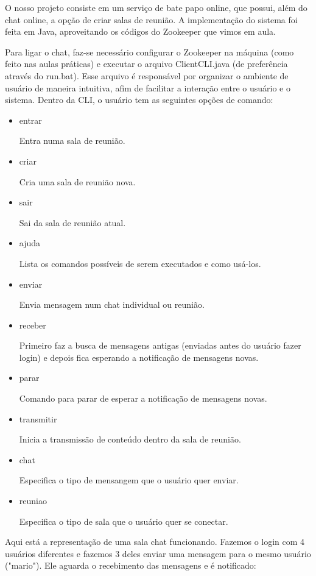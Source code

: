 \setlength{\parindent}{4em}
\setlength{\parskip}{1em}

O nosso projeto consiste em um serviço de bate papo online, que possui, além do chat online, a opção de criar salas de reunião. A implementação do sistema foi feita em Java, aproveitando os códigos do Zookeeper que vimos em aula.\par
Para ligar o chat, faz-se necessário configurar o Zookeeper na máquina (como feito nas aulas práticas) e executar o arquivo ClientCLI.java (de preferência através do run.bat). Esse arquivo é responsável por organizar o ambiente de usuário de maneira intuitiva, afim de facilitar a interação entre o usuário e o sistema. Dentro da CLI, o usuário tem as seguintes opções de comando:
\begin{itemize}
	\item entrar
	\par Entra numa sala de reunião.
	\item criar
	\par Cria uma sala de reunião nova.
	\item sair
	\par Sai da sala de reunião atual.
	\item ajuda
	\par Lista os comandos possíveis de serem executados e como usá-los.
	\item enviar
	\par Envia mensagem num chat individual ou reunião.
	\item receber
	\par Primeiro faz a busca de mensagens antigas (enviadas antes do usuário fazer login) e depois fica esperando a notificação de mensagens novas.
	\item parar
	\par Comando para parar de esperar a notificação de mensagens novas.
	\item transmitir
	\par Inicia a transmissão de conteúdo dentro da sala de reunião.
	\item chat
	\par Especifica o tipo de mensangem que o usuário quer enviar.
	\item reuniao
	\par Especifica o tipo de sala que o usuário quer se conectar.
\end{itemize}
\par
Aqui está a representação de uma sala chat funcionando. Fazemos o login com 4 usuários diferentes e fazemos 3 deles enviar uma mensagem para o mesmo usuário ("mario"). Ele aguarda o recebimento das mensagens e é notificado:
